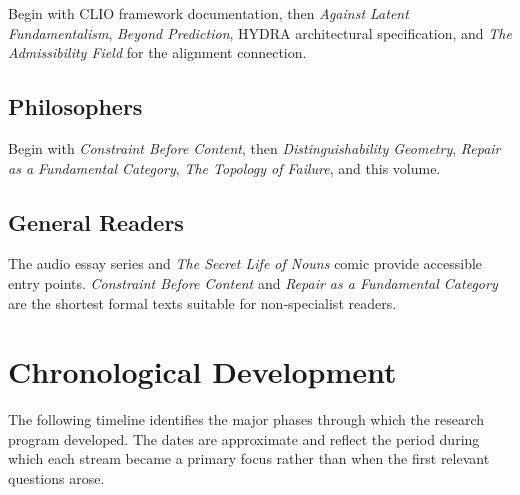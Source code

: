 \documentclass[11pt, oneside]{book}
\theoremstyle{definition}
\theoremstyle{remark}
\begin{document}
Begin with CLIO framework documentation, then \textit{Against Latent Fundamentalism}, \textit{Beyond Prediction}, HYDRA architectural specification, and \textit{The Admissibility Field} for the alignment connection.

\section*{Philosophers}

Begin with \textit{Constraint Before Content}, then \textit{Distinguishability Geometry}, \textit{Repair as a Fundamental Category}, \textit{The Topology of Failure}, and this volume.

\section*{General Readers}

The audio essay series and \textit{The Secret Life of Nouns} comic provide accessible entry points. \textit{Constraint Before Content} and \textit{Repair as a Fundamental Category} are the shortest formal texts suitable for non-specialist readers.


\chapter{Chronological Development}

The following timeline identifies the major phases through which the research program developed. The dates are approximate and reflect the period during which each stream became a primary focus rather than when the first relevant questions arose.
\end{document}
